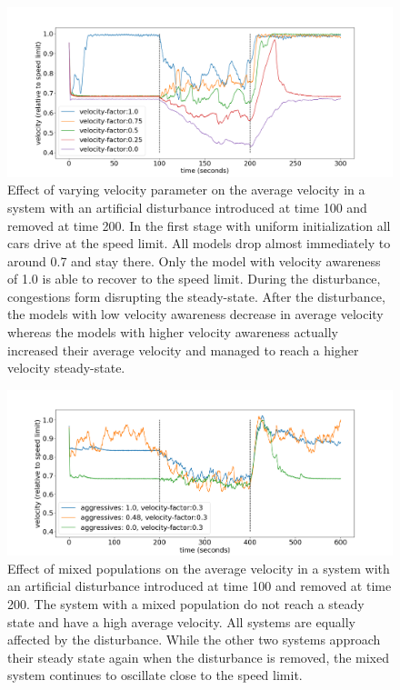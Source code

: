 \documentclass[11pt,a4paper,twocolumn]{article}
\begin{document}
 
\begin{figure}[t]
    \centering
      \includegraphics[scale=0.35, trim={0 0 0 0 }]{figs/velocity_over_time.png}
      \caption{Effect of varying velocity parameter on the average velocity in a system with an artificial disturbance introduced at time 100 and removed at time 200. In the first stage with uniform initialization all cars drive at the speed limit. All models drop almost immediately to around 0.7 and stay there. Only the model with velocity awareness of 1.0 is able to recover to the speed limit. During the disturbance, congestions form disrupting the steady-state. After the disturbance, the models with low velocity awareness decrease in average velocity whereas the models with higher velocity awareness actually increased their average velocity and managed to reach a higher velocity steady-state.}
      \label{fig:vel_over_time}
\end{figure}
 
\begin{figure}[t]     
      \centering
       \includegraphics[scale=0.35]{figs/velocity_over_time_aggressive.png}
       \caption{Effect of mixed populations on the average velocity in a system with an artificial disturbance introduced at time 100 and removed at time 200. The system with a mixed population do not reach a steady state and have a high average velocity. All systems are equally affected by the disturbance. While the other two systems approach their steady state again when the disturbance is removed, the mixed system continues to oscillate close to the speed limit. }
       \label{fig:vel_agg_over_time}
 \end{figure}
\end{document}
